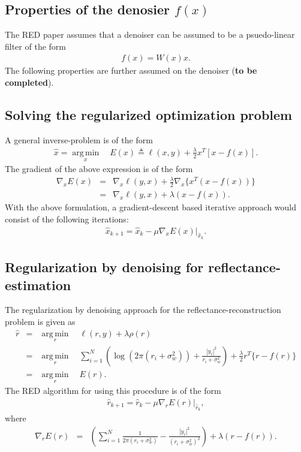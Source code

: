 \documentclass[a4paper, 11pt]{article}
\DeclareMathOperator*{\argmin}{arg\,min}
\begin{document}
\subsection{Properties of the denosier $f(x)$}
The RED paper assumes that a denoiser can be assumed to be a psuedo-linear filter of the form 
\begin{eqnarray*}
f(x)=W(x)x. 
\end{eqnarray*}
The following properties are further assumed on the denoiser (\textbf{to be completed}).
\subsection{Solving the regularized optimization problem}
A general inverse-problem is of the form 
\begin{eqnarray*}
\hat{x}=\underset{x}{\argmin} \quad E(x) \triangleq \ell(x,y)+\frac{\lambda}{2}x^T[x-f(x)]. 
\end{eqnarray*}
The gradient of the above expression is of the form 
\begin{eqnarray*}
\nabla_xE(x)&=&\nabla_x\ell(y,x)+\frac{\lambda}{2}\nabla_x\{x^T(x-f(x))\} \\
&=&\nabla_x\ell(y,x)+\lambda(x-f(x)). 
\end{eqnarray*}
With the above formulation, a gradient-descent based iterative approach would consist of the following iterations:
\begin{eqnarray*}
\hat{x}_{k+1}=\hat{x}_k-\mu \nabla_xE(x)|_{\hat{x}_k}. 
\end{eqnarray*}
\subsection{Regularization by denoising for reflectance-estimation }
The regularization by denoising approach for the reflectance-reconstruction problem is given as 
\begin{eqnarray*}
\hat{r}&=&\underset{r}{\argmin} \quad \ell(r,y)+\lambda \rho(r) \\
&=& \underset{r}{\argmin} \quad \sum_{i=1}^N \left(\log (2\pi (r_i+\sigma_w^2))+\frac{|y_i|^2}{r_i+\sigma_w^2}\right) + \frac{\lambda}{2} r^T\{r-f(r)\} \\
&=&  \underset{r}{\argmin} \quad E(r). 
\end{eqnarray*}
The RED algorithm for using this procedure is of the form 
\begin{eqnarray*}
\hat{r}_{k+1}=\hat{r}_k-\mu \nabla_rE(r)|_{\hat{r}_k}, 
\end{eqnarray*}
where 
\begin{eqnarray*}
\nabla_rE(r)&=& \left(\sum_{i=1}^N \frac{1}{2\pi(r_i+\sigma_w^2)}-\frac{|y_i|^2}{(r_i+\sigma_w^2)^2}\right)+\lambda(r-f(r)). 
\end{eqnarray*}
\end{document}
